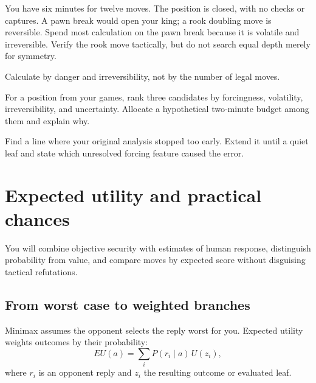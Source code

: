 \begin{workedbox}[title={Worked example: attention allocation}]
You have six minutes for twelve moves. The position is closed, with no checks or captures. A pawn break would open your king; a rook doubling move is reversible. Spend most calculation on the pawn break because it is volatile and irreversible. Verify the rook move tactically, but do not search equal depth merely for symmetry.
\end{workedbox}

\begin{memorybox}
Calculate by danger and irreversibility, not by the number of legal moves.
\end{memorybox}

\begin{exercise}
For a position from your games, rank three candidates by forcingness, volatility, irreversibility, and uncertainty. Allocate a hypothetical two-minute budget among them and explain why.
\end{exercise}

\begin{exercise}
Find a line where your original analysis stopped too early. Extend it until a quiet leaf and state which unresolved forcing feature caused the error.
\end{exercise}


\chapter{Expected utility and practical chances}
\begin{learningbox}
You will combine objective security with estimates of human response, distinguish probability from value, and compare moves by expected score without disguising tactical refutations.
\end{learningbox}

\section{From worst case to weighted branches}
Minimax assumes the opponent selects the reply worst for you. Expected utility weights outcomes by their probability:
\[
EU(a)=\sum_{i}P(r_i\mid a)\,U(z_i),
\]
where $r_i$ is an opponent reply and $z_i$ the resulting outcome or evaluated leaf.

